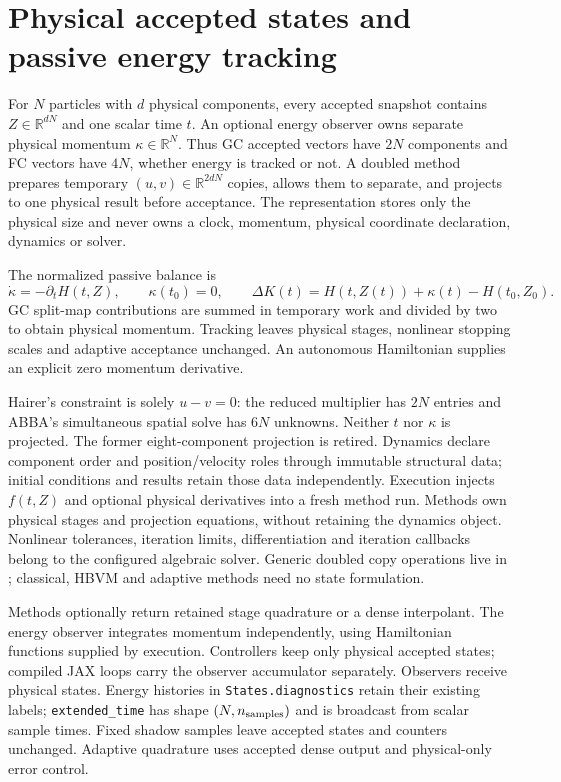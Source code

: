 \documentclass[11pt,a4paper]{article}
\begin{document}
\clearpage
\section{Physical accepted states and passive energy tracking}
For $N$ particles with $d$ physical components, every accepted snapshot contains
$Z\in\mathbb{R}^{dN}$ and one scalar time $t$. An optional energy observer
owns separate physical momentum $\kappa\in\mathbb{R}^{N}$.
Thus GC accepted vectors have $2N$
components and FC vectors have $4N$, whether energy is tracked or not.
A doubled method prepares temporary $(u,v)\in\mathbb{R}^{2dN}$ copies,
allows them to separate, and projects to one physical result before acceptance.
The representation stores only the physical size and never owns a clock,
momentum, physical coordinate declaration, dynamics or solver.

The normalized passive balance is
\[
\dot\kappa=-\partial_tH(t,Z),\qquad \kappa(t_0)=0,\qquad
\Delta K(t)=H(t,Z(t))+\kappa(t)-H(t_0,Z_0).
\]
GC split-map contributions are summed in temporary work and divided by two
to obtain physical momentum. Tracking leaves physical stages, nonlinear
stopping scales and adaptive acceptance unchanged. An autonomous Hamiltonian
supplies an explicit zero momentum derivative.

Hairer's constraint is solely $u-v=0$: the reduced multiplier has $2N$ entries
and ABBA's simultaneous spatial solve has $6N$ unknowns. Neither $t$ nor
$\kappa$ is projected. The former eight-component projection is retired.
Dynamics declare component order and position/velocity roles through immutable
structural data; initial conditions and results retain those data independently.
Execution injects $f(t,Z)$ and optional physical derivatives into a fresh method
run. Methods own physical stages and projection equations, without retaining the
dynamics object. Nonlinear tolerances, iteration limits, differentiation and
iteration callbacks belong to the configured algebraic solver. Generic doubled
copy operations live in ; classical, HBVM and
adaptive methods need no state formulation.

Methods optionally return retained stage quadrature or a dense interpolant.
The energy observer integrates momentum independently, using Hamiltonian
functions supplied by execution. Controllers keep only physical accepted states;
compiled JAX loops carry the observer accumulator separately.
Observers receive physical states. Energy histories in \texttt{States.diagnostics}
retain their existing labels; \texttt{extended\_time} has shape
$(N,n_{\rm samples})$ and is broadcast from scalar sample times.
Fixed shadow samples leave accepted states and counters unchanged. Adaptive
quadrature uses accepted dense output and physical-only error control.
\end{document}
